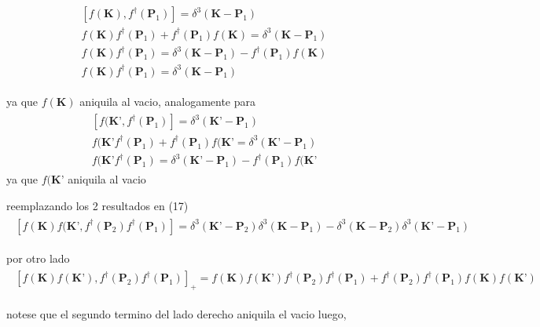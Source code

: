 \begin{gather}
\begin{split}
[f(\textbf{K}),f^{\dagger}(\textbf{P}_1)]=\delta^{3}(\textbf{K}-\textbf{P}_1)\\
f(\textbf{K})f^{\dagger}(\textbf{P}_1)+f^{\dagger}(\textbf{P}_1)f(\textbf{K})=\delta^{3}(\textbf{K}-\textbf{P}_1)\\
f(\textbf{K})f^{\dagger}(\textbf{P}_1)=\delta^{3}(\textbf{K}-\textbf{P}_1)-f^{\dagger}(\textbf{P}_1)f(\textbf{K})\\
f(\textbf{K})f^{\dagger}(\textbf{P}_1)=\delta^{3}(\textbf{K}-\textbf{P}_1)
\end{split}
\end{gather}

ya que $f(\textbf{K})$ aniquila al vacio, analogamente para
\begin{gather}
\begin{split}
[f(\textbf{K'},f^{\dagger}(\textbf{P}_1)]=\delta^{3}(\textbf{K'}-\textbf{P}_1)\\
f(\textbf{K'}f^{\dagger}(\textbf{P}_1)+f^{\dagger}(\textbf{P}_1)f(\textbf{K'}=\delta^{3}(\textbf{K'}-\textbf{P}_1)\\
f(\textbf{K'}f^{\dagger}(\textbf{P}_1)=\delta^{3}(\textbf{K'}-\textbf{P}_1)-f^{\dagger}(\textbf{P}_1)f(\textbf{K'}
\end{split}
\end{gather}
ya que $f(\textbf{K'}$ aniquila al vacio

reemplazando los 2 resultados en (17)
\begin{gather}
\begin{split}
[f(\textbf{K})f(\textbf{K'},f^{\dagger}(\textbf{P}_2)f^{\dagger}(\textbf{P}_1)]=\delta^{3}(\textbf{K'}-\textbf{P}_2)\delta^{3}(\textbf{K}-\textbf{P}_1)-\delta^{3}(\textbf{K}-\textbf{P}_2)\delta^{3}(\textbf{K'}-\textbf{P}_1)
\end{split}
\end{gather}

por otro lado
\begin{gather}
\begin{split}
[f(\textbf{K})f(\textbf{K'}),f^{\dagger}(\textbf{P}_2)f^{\dagger}(\textbf{P}_1)]_{+}=f(\textbf{K})f(\textbf{K'})f^{\dagger}(\textbf{P}_2)f^{\dagger}(\textbf{P}_1)+f^{\dagger}(\textbf{P}_2)f^{\dagger}(\textbf{P}_1)f(\textbf{K})f(\textbf{K'})
\end{split}
\end{gather}

notese que el segundo termino del lado derecho aniquila el vacio luego,

